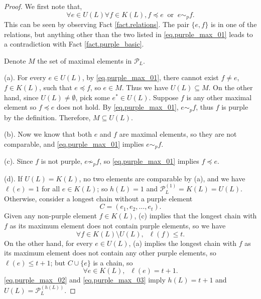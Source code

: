 \documentclass[12pt]{article}
\begin{document}
\begin{proof}
We first note that,
\begin{equation}\label{eq.purple_max_01}
\forall e \in U(L) \forall f \in K(L), f \preccurlyeq e \;\;\text{or}\;\; e \sim_p f.
\end{equation}
This can be seen by observing Fact \ref{fact.relations}.
The pair $\{e, f\}$ is in one of the relations, but anything other than
the two listed in \eqref{eq.purple_max_01}
leads to a contradiction with Fact \ref{fact.purple_basic}.

Denote $M$ the set of maximal elements in $\mathcal{P}_L$.

(a).  For every $e \in U(L)$, by \eqref{eq.purple_max_01},
there cannot exist $f \neq e$, $f \in K(L)$, such that
$e \preccurlyeq f$, so $e \in M$. Thus we have $U(L) \subseteq M$.
On the other hand, 
since $U(L) \neq \emptyset$, pick some $e^* \in U(L)$.
Suppose $f$ is any other maximal element so $f \preccurlyeq e$ does not hold.
By \eqref{eq.purple_max_01}, $e \sim_p f$, thus $f$ is purple by the definition.
Therefore, $M \subseteq U(L)$. 

(b). Now we know that both $e$ and $f$ are maximal elements, so they are not comparable,
and \eqref{eq.purple_max_01} implies $e \sim_p f$.

(c). Since $f$ is not purple, $e \not\sim_p f$, so \eqref{eq.purple_max_01} implies $f \preccurlyeq e$.

(d). If $U(L) = K(L)$, no two elements are comparable by (a), and we have $\ell(e) = 1$ for all $e \in K(L)$;
so $h(L) = 1$ and $\mathcal{P}_L^{(1)} = K(L) = U(L)$.
Otherwise, consider a longest chain without a purple element
\[
C = (e_1, e_2, \dots, e_t).
\]
Given any non-purple element $f \in K(L)$,
(c) implies that the longest chain with $f$ as its maximum element
does not contain purple elements, so we have
\begin{equation}\label{eq.purple_max_02}
\forall f \in K(L) \setminus U(L),\;\; \ell(f) \le t.
\end{equation}
On the other hand, for every $e \in U(L)$, 
(a) implies the longest chain with $f$ as its maximum element
does not contain any other purple elements,
so $\ell(e) \le t+1$; but $C \cup \{e\}$ is a chain, so
\begin{equation}\label{eq.purple_max_03}
\forall e \in K(L), \;\; \ell(e) = t+1.
\end{equation}
\eqref{eq.purple_max_02} and \eqref{eq.purple_max_03} imply
$h(L) = t+1$ and $U(L) = \mathcal{P}_L^{(h(L))}$.
\end{proof}
\end{document}
